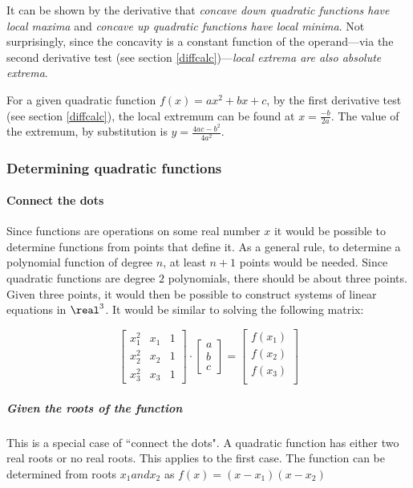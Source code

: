 It can be shown by the derivative that \emph{concave down quadratic functions have local maxima} and \emph{concave up quadratic functions have local minima}.
Not surprisingly, since the concavity is a constant function of the operand---via the second derivative test (see section \ref{diffcalc})---\emph{local extrema are also absolute extrema}.

For a given quadratic function $f(x) = ax^2+bx+c$, by the first derivative test (see section \ref{diffcalc}), the local extremum can be found at $x = \frac{-b}{2a}$.
The value of the extremum, by substitution is $y = \frac{4ac-b^2}{4a^2}$.

\subsubsection{Determining quadratic functions}
\paragraph{Connect the dots}
Since functions are operations on some real number $x$ it would be possible to determine functions from points that define it.
As a general rule, to determine a polynomial function of degree $n$, at least $n+1$ points would be needed.
Since quadratic functions are degree $2$ polynomials, there should be about three points.
Given three points, it would then be possible to construct systems of linear equations in $\real ^3$.
It would be similar to solving the following matrix:

\[
\begin{bmatrix}
x_1^2 & x_1 & 1 \\
x_2^2 & x_2 & 1 \\
x_3^2 & x_3 & 1
\end{bmatrix}
\cdot
\begin{bmatrix}
a \\
b \\
c
\end{bmatrix}
=
\begin{bmatrix}
f(x_1) \\
f(x_2) \\
f(x_3) \\
\end{bmatrix}
\]

\subparagraph{Given the roots of the function}
This is a special case of ``connect the dots".
A quadratic function has either two real roots or no real roots.
This applies to the first case.
The function can be determined from roots $x_1 and x_2$ as $f(x) = (x-x_1)(x-x_2)$

